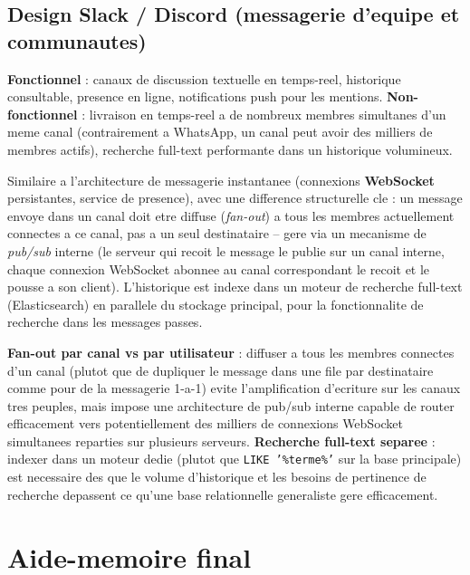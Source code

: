 \documentclass[11pt,a4paper]{article}
\newenvironment{sujet}[1]{%
  \subsection{#1}
}{%
  \bigskip
}
\begin{document}
\begin{sujet}{Design Slack / Discord (messagerie d'equipe et communautes)}

\begin{req}
\textbf{Fonctionnel} : canaux de discussion textuelle en temps-reel, historique consultable, presence en ligne, notifications push pour les mentions. \textbf{Non-fonctionnel} : livraison en temps-reel a de nombreux membres simultanes d'un meme canal (contrairement a WhatsApp, un canal peut avoir des milliers de membres actifs), recherche full-text performante dans un historique volumineux.
\end{req}

\begin{archbox}
Similaire a l'architecture de messagerie instantanee (connexions \textbf{WebSocket} persistantes, service de presence), avec une difference structurelle cle : un message envoye dans un canal doit etre diffuse (\emph{fan-out}) a tous les membres actuellement connectes a ce canal, pas a un seul destinataire -- gere via un mecanisme de \emph{pub/sub} interne (le serveur qui recoit le message le publie sur un canal interne, chaque connexion WebSocket abonnee au canal correspondant le recoit et le pousse a son client). L'historique est indexe dans un moteur de recherche full-text (Elasticsearch) en parallele du stockage principal, pour la fonctionnalite de recherche dans les messages passes.
\end{archbox}

\begin{tradeoff}
\textbf{Fan-out par canal vs par utilisateur} : diffuser a tous les membres connectes d'un canal (plutot que de dupliquer le message dans une file par destinataire comme pour de la messagerie 1-a-1) evite l'amplification d'ecriture sur les canaux tres peuples, mais impose une architecture de pub/sub interne capable de router efficacement vers potentiellement des milliers de connexions WebSocket simultanees reparties sur plusieurs serveurs. \textbf{Recherche full-text separee} : indexer dans un moteur dedie (plutot que \texttt{LIKE '\%terme\%'} sur la base principale) est necessaire des que le volume d'historique et les besoins de pertinence de recherche depassent ce qu'une base relationnelle generaliste gere efficacement.
\end{tradeoff}

\end{sujet}

\newpage
\section{Aide-memoire final}
\end{document}
